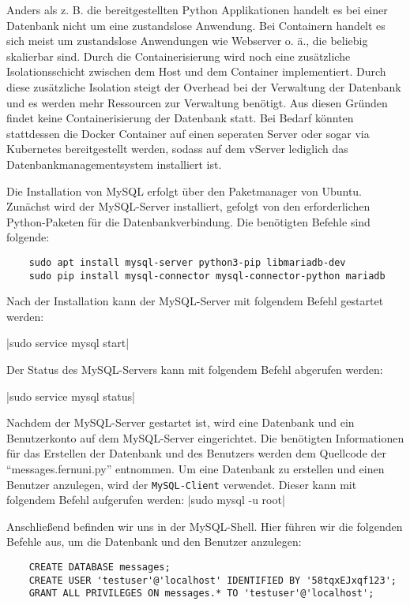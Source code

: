 Anders als z. B. die bereitgestellten Python Applikationen handelt es bei einer Datenbank nicht um eine zustandslose Anwendung. Bei Containern handelt es sich meist um zustandslose Anwendungen wie Webserver o. ä., die beliebig skalierbar sind. Durch die Containerisierung wird noch eine zusätzliche Isolationsschicht zwischen dem Host und dem Container implementiert. Durch diese zusätzliche Isolation steigt der Overhead bei der Verwaltung der Datenbank und es werden mehr Ressourcen zur Verwaltung benötigt. Aus diesen Gründen findet keine Containerisierung der Datenbank statt. Bei Bedarf könnten stattdessen die Docker Container auf einen seperaten Server oder sogar via Kubernetes bereitgestellt werden, sodass auf dem vServer lediglich das Datenbankmanagementsystem installiert ist.

Die Installation von MySQL erfolgt über den Paketmanager von Ubuntu. Zunächst wird der MySQL-Server installiert, gefolgt von den erforderlichen Python-Paketen für die Datenbankverbindung. Die benötigten Befehle sind folgende:

\begin{verbatim}
    sudo apt install mysql-server python3-pip libmariadb-dev
    sudo pip install mysql-connector mysql-connector-python mariadb
\end{verbatim}

Nach der Installation kann der MySQL-Server mit folgendem Befehl gestartet werden:

|sudo service mysql start|

Der Status des MySQL-Servers kann mit folgendem Befehl abgerufen werden:

|sudo service mysql status|

Nachdem der MySQL-Server gestartet ist, wird eine Datenbank und ein Benutzerkonto auf dem MySQL-Server eingerichtet. Die benötigten Informationen für das Erstellen der Datenbank und des Benutzers werden dem Quellcode der \enquote{messages.fernuni.py} entnommen.
Um eine Datenbank zu erstellen und einen Benutzer anzulegen, wird der \verb+MySQL-Client+ verwendet. Dieser kann mit folgendem Befehl aufgerufen werden:
|sudo mysql -u root|

Anschließend befinden wir uns in der MySQL-Shell. Hier führen wir die folgenden Befehle aus, um die Datenbank und den Benutzer anzulegen:

\begin{verbatim}
    CREATE DATABASE messages;
    CREATE USER 'testuser'@'localhost' IDENTIFIED BY '58tqxEJxqf123';
    GRANT ALL PRIVILEGES ON messages.* TO 'testuser'@'localhost';
\end{verbatim}

